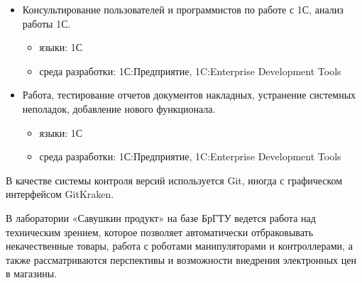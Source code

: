 \begin{itemize}
\begin{itemize}
  \end{itemize}
  \item Консультирование пользователей и программистов по работе с 1С, анализ работы 1С.
  \begin{itemize}
      \item языки: 1С
      \item среда разработки: 1С:Предприятие, 1C:Enterprise Development Tools
  \end{itemize}
  \item Работа, тестирование отчетов документов накладных, устранение системных неполадок, добавление нового функционала.
  \begin{itemize}
      \item языки: 1С
      \item среда разработки: 1С:Предприятие, 1C:Enterprise Development Tools
  \end{itemize}
\end{itemize}
В качестве системы контроля версий используется Git, иногда с графическом интерфейсом GitKraken.

В лаборатории «Савушкин продукт» на базе БрГТУ ведется работа над техническим зрением, которое позволяет автоматически отбраковывать некачественные товары, работа с роботами манипуляторами и контроллерами, а также рассматриваются перспективы и возможности внедрения электронных цен в магазины.


